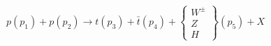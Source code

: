 \documentclass[10pt]{article}
\begin{document}
\[
p(p_1) + p(p_2) \to t(p_3) + \bar{t}(p_4) + \left\{ \begin{array}{c} W^\pm \\ Z \\ H \end{array}\right\}(p_5) + X
\]
\end{document}
